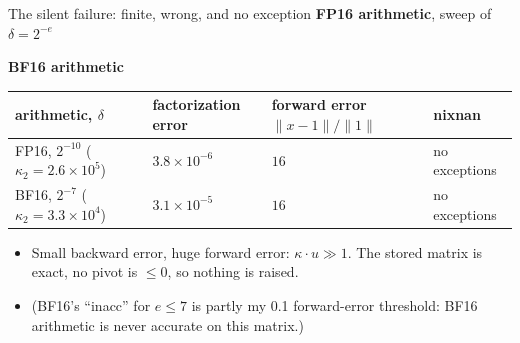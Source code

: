\documentclass[aspectratio=169,10pt,xcolor=table]{beamer}
\begin{document}
\begin{frame}{The silent failure: finite, wrong, and no exception}
\footnotesize\centering
\textbf{FP16 arithmetic}, sweep of $\delta=2^{-e}$\\[1mm]
\scriptsize

\vspace{2mm}\footnotesize\textbf{BF16 arithmetic}\\[1mm]
\scriptsize

\vspace{3mm}
\begin{tabular}{llll}
\toprule
arithmetic, $\delta$ & factorization error & forward error $\|x-1\|/\|1\|$ & nixnan\\
\midrule
FP16, $2^{-10}$ ($\kappa_2=2.6\times10^{5}$) & $3.8\times10^{-6}$ & \cellcolor{red!25}$16$ & no exceptions\\
BF16, $2^{-7}$ ($\kappa_2=3.3\times10^{4}$) & $3.1\times10^{-5}$ & \cellcolor{red!25}$16$ & no exceptions\\
\bottomrule
\end{tabular}

\vspace{2mm}\footnotesize\raggedright
\begin{itemize}
\item Small backward error, huge forward error: $\kappa\cdot u\gg1$. The stored matrix is exact, no pivot is $\le0$, so nothing is raised.
\item (BF16's ``inacc'' for $e\le7$ is partly my 0.1 forward-error threshold: BF16 arithmetic is never accurate on this matrix.)
\end{itemize}
\end{frame}
\end{document}
